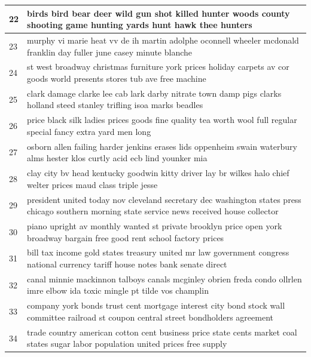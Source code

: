 \documentclass[letterpaper,11pt]{report}
\begin{document}
\begin{longtable}[c]{| p{1cm} | p{16cm} |}
22 & birds bird bear deer wild gun shot killed hunter woods county shooting game hunting yards hunt hawk thee hunters                                                 \\ \hline
23 & murphy vi marie heat vv de ih martin adolphe oconnell wheeler mcdonald franklin day fuller june casey minute blanche                                             \\ \hline
24 & st west broadway christmas furniture york prices holiday carpets av cor goods world presents stores tub ave free machine                                         \\ \hline
25 & clark damage clarke lee cab lark darby nitrate town damp pigs clarks holland steed stanley trifling isoa marks beadles                                           \\ \hline
26 & price black silk ladies prices goods fine quality tea worth wool full regular special fancy extra yard men long                                                  \\ \hline
27 & osborn allen failing harder jenkins erases lids oppenheim swain waterbury alms hester klos curtly acid ecb lind younker mia                                      \\ \hline
28 & clay city bv head kentucky goodwin kitty driver lay br wilkes halo chief welter prices maud class triple jesse                                                   \\ \hline
29 & president united today nov cleveland secretary dec washington states press chicago southern morning state service news received house collector                  \\ \hline
30 & piano upright av monthly wanted st private brooklyn price open york broadway bargain free good rent school factory prices                                        \\ \hline
31 & bill tax income gold states treasury united mr law government congress national currency tariff house notes bank senate direct                                   \\ \hline
32 & canal minnie mackinnon talboys canals mcginley obrien freda condo ollrlen imre elbow ida toxic mingle pt tilde vos champlin                                      \\ \hline
33 & company york bonds trust cent mortgage interest city bond stock wall committee railroad st coupon central street bondholders agreement                           \\ \hline
34 & trade country american cotton cent business price state cents market coal states sugar labor population united prices free supply                                \\ \hline

\end{longtable}
\end{document}
